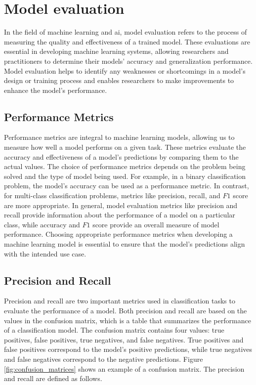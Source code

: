 \section{Model evaluation}
    In the field of machine learning and \gls{ai}, model evaluation refers to the process of measuring the quality and effectiveness of a trained model. These evaluations are essential in developing machine learning systems, allowing researchers and practitioners to determine their models' accuracy and generalization performance. Model evaluation helps to identify any weaknesses or shortcomings in a model's design or training process and enables researchers to make improvements to enhance the model's performance.

    \subsection*{Performance Metrics}
    \label{sec2:performance_metrics}
    Performance metrics are integral to machine learning models, allowing us to measure how well a model performs on a given task. These metrics evaluate the accuracy and effectiveness of a model's predictions by comparing them to the actual values. The choice of performance metrics depends on the problem being solved and the type of model being used. For example, in a binary classification problem, the model's accuracy can be used as a performance metric. In contrast, for multi-class classification problems, metrics like precision, recall, and $F1$ score are more appropriate. In general, model evaluation metrics like precision and recall provide information about the performance of a model on a particular class, while accuracy and $F1$ score provide an overall measure of model performance. Choosing appropriate performance metrics when developing a machine learning model is essential to ensure that the model's predictions align with the intended use case.
    
    \subsection{Precision and Recall}
    Precision and recall are two important metrics used in classification tasks to evaluate the performance of a model. 
    Both precision and recall are based on the values in the confusion matrix, which is a table that summarizes the performance of a classification model. The confusion matrix contains four values: true positives, false positives, true negatives, and false negatives. True positives and false positives correspond to the model's positive predictions, while true negatives and false negatives correspond to the negative predictions. Figure \ref{fig:confusion_matrices} shows an example of a confusion matrix. The precision and recall are defined as follows.
        


